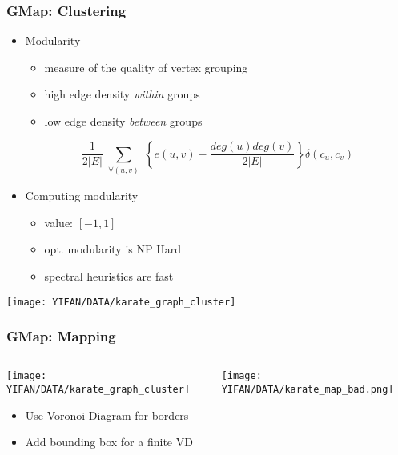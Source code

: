 \documentclass{beamer}
\begin{document}
\begin{frame}[plain]
\frametitle{GMap: Clustering}
\begin{itemize}
\item Modularity
\begin{itemize}
\item measure of the quality of vertex grouping
\item high edge density {\em within} groups
\item 
low edge density {\em between} groups
\end{itemize}
\begin{block}{}
$$\frac{1}{2|E|} \sum_{\substack{\forall(u,v)}} \left\{ e(u,v) - \frac{deg(u)deg(v)}{2|E|} \right\} \delta(c_u, c_v)$$
\end{block}
\item Computing modularity
\begin{itemize}
\item value: $[-1, 1]$
\item opt. modularity is NP Hard
\item spectral heuristics are fast
\end{itemize}
\end{itemize}
\vspace{-1.5cm}\hspace{5.6cm}\texttt{[image: YIFAN/DATA/karate\_graph\_cluster]}

\end{frame}


\begin{frame}[plain]
\frametitle{GMap: Mapping}

\begin{columns}
\begin{column}{7cm}
\begin{center}\texttt{[image: YIFAN/DATA/karate\_graph\_cluster]}
\end{center}
\begin{itemize}
\item{} Use Voronoi Diagram for borders
\item{} Add bounding box for a finite VD
\end{itemize}
\vfill
\end{column}
\pause
\begin{column}{5cm}
\begin{center}
\texttt{[image: YIFAN/DATA/karate\_map\_bad.png]}
\end{center}
\end{column}
\end{columns}
\end{frame}
\end{document}
